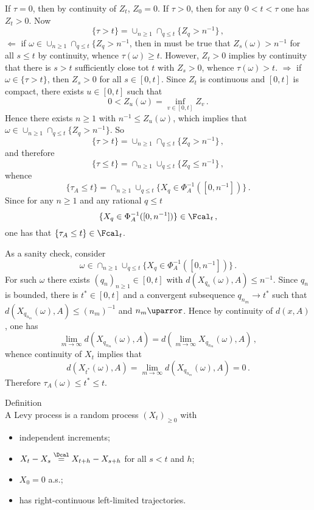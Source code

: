 If $\tau=0$, then by continuity of $Z_t$, $Z_0=0$. If $\tau>0$, then for any
$0<t<\tau$ one has $Z_t>0$. Now
\[ \{\tau > t\} = \cup_{n\geq 1} \cap_{q\leq t} \{Z_q > n^{-1} \} \,, \]
$\Leftarrow$ if $\omega\in \cup_{n\geq 1} \cap_{q\leq t} \{Z_q > n^{-1}$, then
in must be true that $Z_s(\omega)>n^{-1}$ for all $s\leq t$ by continuity, whence
$\tau(\omega)\geq t$. However, $Z_t>0$ implies by continuity that there is $s>t$
sufficiently close tot $t$ with $Z_s>0$, whence $\tau(\omega)>t$.
$\Rightarrow$ if $\omega\in\{\tau>t\}$, then $Z_s>0$ for all $s\in[0,t]$. Since
$Z_t$ is continuous and $[0,t]$ is compact, there exists $u\in[0,t]$ such that
\[ 0 < Z_u(\omega) = \inf_{v\in[0,t]}Z_v \,. \]
Hence there exists $n\geq 1$ with $n^{-1}\leq Z_u(\omega)$, which implies that
$\omega \in \cup_{n\geq1} \cap_{ q\leq t } \{Z_q>n^{-1}\}$. So 
\[ \{\tau>t\} = \cup_{n\geq1} \cap_{ q\leq t } \{Z_q>n^{-1}\} \,, \]
and therefore
\[ \{\tau\leq t\} = \cap_{n\geq1} \cup_{ q\leq t } \{Z_q\leq n^{-1}\} \,, \]
whence
\[ \{\tau_A\leq t\} = \cap_{n\geq1} \cup_{ q\leq t } \{X_q\in \Phi_A^{-1}([0,n^{-1}])\} \,. \]
Since for any $n\geq1$ and any rational $q\leq t$
\[ \{X_q\in \Phi_A^{-1}([0,n^{-1}])\} \in \Fcal_t \,,\]
one has that $\{\tau_A\leq t\}\in \Fcal_t$.

As a sanity check, consider
\[ \omega \in \cap_{n\geq1} \cup_{ q\leq t } \{X_q\in \Phi_A^{-1}([0,n^{-1}])\} \,. \]
For such $\omega$ there exists $(q_n)_{n\geq1}\in[0,t]$ with $d(X_{q_n}(\omega),A)\leq n^{-1}$.
Since $q_n$ is bounded, there is $t^*\in[0,t]$ and a convergent subsequence $q_{n_m}\to t^*$
such that $d(X_{q_{n_m}}(\omega),A)\leq (n_m)^{-1}$ and $n_m\uparror$. Hence by continuity
of $d(x,A)$, one has 
\[ \lim_{m\to \infty} d(X_{q_{n_m}}(\omega),A) = d( \lim_{m\to \infty} X_{q_{n_m}}(\omega),A)\,, \]
whence continuity of $X_t$ implies that
\[ d(X_{t^*}(\omega),A)= \lim_{m\to \infty} d(X_{q_{n_m}}(\omega),A) = 0 \,. \]
Therefore $\tau_A(\omega)\leq t^*\leq t$.

\noindent Definition\hfill\\
A Levy process is a random process $(X_t)_{\geq0}$ with \begin{itemize}
	\item independent increments;
	\item $X_t-X_s \overset{\Dcal}{=} X_{t+h}-X_{s+h}$ for all $s<t$ and $h$;
	\item $X_0=0$ a.s.;
	\item has right-continuous left-limited trajectories.
\end{itemize}

